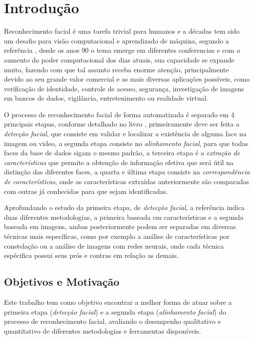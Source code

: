 
\chapter*[Introdução]{Introdução}

Reconhecimento facial é uma tarefa trivial para humanos e a décadas tem sido um desafio para visão computacional e aprendizado de máquina, segundo a referência , desde os anos 90 o tema emerge em diferentes conferencias e com o aumento do poder computacional dos dias atuais, sua capacidade se expande muito, fazendo com que tal assunto receba enorme atenção, principalmente devido ao seu grande valor comercial e as mais diversas aplicações possíveis, como verificação de identidade, controle de acesso, segurança, investigação de imagens em bancos de dados, vigilância, entretenimento ou realidade virtual. \cite{appli2014} \cite{Zhao:2003:FRL:954339.954342}

O processo de reconhecimento facial de forma automatizada é separado em 4 principais etapas, conforme detalhado no livro , primeiramente deve ser feita a \textit{detecção facial}, que consiste em validar e localizar a existência de alguma face na imagem ou video, a segunda etapa consiste no \textit{alinhamento facial}, para que todas faces da base de dados sigam o mesmo padrão, a terceira etapa é a \textit{extração de características} que permite a obtenção de informação efetiva que será útil na distinção das diferentes faces, a quarta e última etapa consiste na \textit{correspondência de características}, onde as características extraídas anteriormente são comparadas com outras já conhecidas para que sejam identificadas.

Aprofundando o estudo da primeira etapa, de \textit{detecção facial}, a referência  indica duas diferentes metodologias, a primeira baseada em características e a segunda baseada em imagens, ambas posteriormente podem ser separadas em diversas técnicas mais específicas, como por exemplo a análise de características por constelação ou a análise de imagens com redes neurais, onde cada técnica espécifica possui seus prós e contras em relação as demais.

\section{Objetivos e Motivação}
Este trabalho tem como objetivo encontrar a melhor forma de atuar sobre a primeira etapa (\textit{detecção facial}) e a segunda etapa (\textit{alinhamento facial}) do processo de reconhecimento facial, avaliando o desempenho qualitativo e quantitativo de diferentes metodologias e ferramentas disponíveis.

